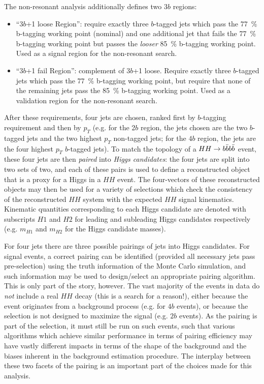 The non-resonant analysis additionally defines two $3b$ regions:
\begin{itemize}
	\item ``3$b$+1 loose Region'': require exactly three $b$-tagged jets which 
	pass the 77~\% b-tagging working point (nominal) and one additional jet that fails the  
	77~\% b-tagging working point but passes the \emph{looser} 85~\% b-tagging working point. Used 
	as a signal region for the non-resonant search.
	\item ``3$b$+1 fail Region'': complement of 3$b$+1 loose. Require exactly three $b$-tagged jets 
	which pass the 77~\% b-tagging working point, but require that none of the remaining jets pass 
	the 85~\% b-tagging working point. Used as a validation region for the non-resonant search.
\end{itemize}
After these requirements, four jets are chosen, ranked first by $b$-tagging requirement and then 
by $p_{T}$ (e.g. for the 2$b$ region, the jets chosen are the two $b$-tagged jets and the two 
highest $p_{T}$ non-tagged jets; for the $4b$ region, the jets are the four highest $p_{T}$ $b$-tagged
jets). To match the topology of a $HH\rightarrow b\bar{b}b\bar{b}$ event, these four jets are then \emph{paired}
into \emph{Higgs candidates}: the four jets are split into two sets of two, and each of these pairs is
used to define a reconstructed object that is a proxy for a Higgs in a $HH$ event. The four-vectors of 
these reconstructed objects may then be used for a variety of selections which check the consistency 
of the reconstructed $HH$ system with the expected $HH$ signal kinematics. Kinematic quantities corresponding 
to each Higgs candidate are denoted with subscripts $H1$ and $H2$ for leading and subleading Higgs candidates 
respectively (e.g. $m_{H1}$ and $m_{H2}$ for the Higgs candidate masses).

For four jets there are three possible pairings of jets into Higgs candidates. For signal events, a correct 
pairing can be identified
(provided all necessary jets pass pre-selection) using the truth information of the Monte Carlo simulation, 
and such information may be used to design/select an appropriate pairing algorithm. This is only part of 
the story, however. The vast majority of the events in data do \emph{not} include a real $HH$ decay (this is 
a search for a reason!), either because the event originates from a background process (e.g. for $4b$ events), or 
because the selection is not designed to maximize the signal (e.g. $2b$ events). As the pairing is 
part of the selection, it must still be run on such events, such that various algorithms which achieve similar
performance in terms of pairing efficiency may have vastly different impacts in terms of the shape of the background
and the biases inherent in the background estimation procedure. The interplay between these two facets of the 
pairing is an important part of the choices made for this analysis.

